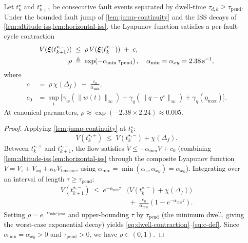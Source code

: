 \begin{lemma}
\label{lem:dwell-decay}
Let $t_k^\star$ and $t_{k+1}^\star$ be consecutive fault
events separated by dwell-time $\tau_{d,k} \ge
\tau_{\mathrm{pend}}$. Under the bounded fault jump of
\cref{lem:jump-continuity} and the ISS decays of
\cref{lem:altitude-iss,lem:horizontal-iss}, the Lyapunov
function satisfies a per-fault-cycle contraction
\begin{align}
  V(\boldsymbol{\xi}(t_{k+1}^{\star,-}))
    &\;\le\;
    \rho\,V(\boldsymbol{\xi}(t_k^{\star,-})) \;+\; c,
  \label{eq:dwell-contraction}\\
  \rho
    &\;\triangleq\;
    \exp\!\left(-\alpha_{\min}\,\tau_{\mathrm{pend}}\right),
  \quad \alpha_{\min} = \alpha_{xy} = \SI{2.38}{\second^{-1}},
  \label{eq:rho-def}
\end{align}
where
\begin{align}
\label{eq:c-def}
  c \;&=\; \rho\,\chi(\Delta_f) \;+\;
          \frac{c_0}{\alpha_{\min}},\\
  c_0 &= \sup_{t}\!
    \bigl[\gamma_w(\|w(t)\|_\infty)
          + \gamma_q(\|q - q^\star\|_\infty)
          + \gamma_\eta(\eta_{\max})\bigr].\nonumber
\end{align}
At canonical parameters, $\rho \approx
\exp(-2.38 \times 2.24) \approx 0.005$.
\end{lemma}

\begin{proof}
Applying \cref{lem:jump-continuity} at $t_k^\star$:
\begin{equation}
  V(t_k^{\star,+}) \;\le\; V(t_k^{\star,-}) + \chi(\Delta_f).
  \label{eq:jump-step}
\end{equation}
Between $t_k^{\star,+}$ and $t_{k+1}^{\star,-}$, the flow
satisfies $\dot V \le -\alpha_{\min} V + c_0$ (combining
\cref{lem:altitude-iss,lem:horizontal-iss} through the
composite Lyapunov function $V = V_z + V_{xy} + \kappa_V
V_{\mathrm{tension}}$, using $\alpha_{\min} =
\min(\alpha_z, \alpha_{xy}) = \alpha_{xy}$). Integrating
over an interval of length $\tau \ge \tau_{\mathrm{pend}}$:
\begin{align}
  V(t_{k+1}^{\star,-})
    \;\le\;
    e^{-\alpha_{\min}\tau}&\bigl(V(t_k^{\star,-})
      + \chi(\Delta_f)\bigr)\\
    &\;+\; \frac{c_0}{\alpha_{\min}}(1 - e^{-\alpha_{\min}\tau}).\nonumber
\end{align}
Setting $\rho = e^{-\alpha_{\min}\tau_{\mathrm{pend}}}$ and
upper-bounding $\tau$ by $\tau_{\mathrm{pend}}$ (the minimum
dwell, giving the worst-case exponential decay) yields
\eqref{eq:dwell-contraction}--\eqref{eq:c-def}.
Since $\alpha_{\min} = \alpha_{xy} > 0$ and
$\tau_{\mathrm{pend}} > 0$, we have $\rho \in (0,1)$.
\end{proof}

